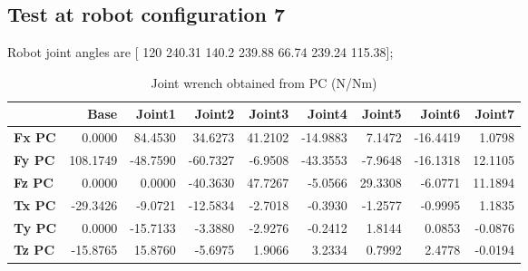 
\subsection{Test at robot configuration 7}
Robot joint angles are  [ 120        240.31         140.2        239.88         66.74        239.24        115.38];

\begin{table}[h!]
	\centering
	\caption{Joint wrench obtained from PC (N/Nm)}
	\label{wrech_PC_Pose7}
	\begin{tabular}{|l|r|r|r|r|r|r|r|r|}
		\hline
		\textbf{}  & \textbf{Base} & \textbf{Joint1}  & \textbf{Joint2}  & \textbf{Joint3}  & \textbf{Joint4}  & \textbf{Joint5}  & \textbf{Joint6}  & \textbf{Joint7} \\ \hline
		\textbf{Fx PC}  & 0.0000        & 84.4530        & 34.6273        & 41.2102        & -14.9883        & 7.1472        & -16.4419        & 1.0798 \\ \hline
		\textbf{Fy PC}  & 108.1749        & -48.7590        & -60.7327        & -6.9508        & -43.3553        & -7.9648        & -16.1318        & 12.1105 \\ \hline
		\textbf{Fz PC}  & 0.0000        & 0.0000        & -40.3630        & 47.7267        & -5.0566        & 29.3308        & -6.0771        & 11.1894 \\ \hline
		\textbf{Tx PC}  & -29.3426        & -9.0721        & -12.5834        & -2.7018        & -0.3930        & -1.2577        & -0.9995        & 1.1835 \\ \hline
		\textbf{Ty PC}  & 0.0000        & -15.7133        & -3.3880        & -2.9276        & -0.2412        & 1.8144        & 0.0853        & -0.0876 \\ \hline
		\textbf{Tz PC}  & -15.8765        & 15.8760        & -5.6975        & 1.9066        & 3.2334        & 0.7992        & 2.4778        & -0.0194 \\ \hline
	\end{tabular}
\end{table}


